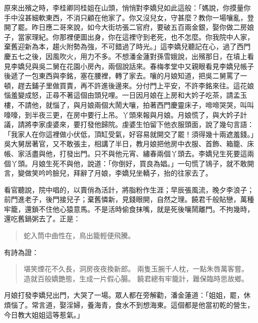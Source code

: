 原來出殯之時，李桂卿同桂姐在山頭，悄悄對李嬌兒如此這般：「媽說，你摸量你手中沒甚細軟東西，不消只顧在他家了。你又沒兒女，守甚麼？教你一場嚷亂，登開了罷。昨日應二哥來說，如今大街坊張二官府，要破五百兩金銀，娶你做二房娘子，當家理紀。你那裡便圖出身，你在這裡守到老死，也不怎麼。你我院中人家，棄舊迎新為本，趨火附勢為強，不可錯過了時光。」這李嬌兒聽記在心，過了西門慶五七之後，因風吹火，用力不多。不想潘金蓮對孫雪娥說，出殯那日，在墳上看見李嬌兒與吳二舅在花園小房內，兩個說話來。春梅孝堂中又親眼看見李嬌兒帳子後遞了一包東西與李銘，塞在腰裡，轉了家去。嚷的月娘知道，把吳二舅罵了一頓，趕去鋪子里做買賣，再不許進後邊來。分付門上平安，不許李銘來往。這花娘惱羞變成怒，正尋不著這個由頭兒哩。一日因月娘在上房和大妗子吃茶，請孟玉樓，不請他，就惱了，與月娘兩個大鬧大嚷，拍著西門慶靈床子，啼啼哭哭，叫叫嚎嚎，到半夜三更，在房中要行上吊。丫頭來報與月娘。月娘慌了，與大妗子計議，請將李家虔婆來，要打發他歸院。虔婆生怕留下他衣服頭面，說了幾句言語：「我家人在你這裡做小伏低，頂缸受氣，好容易就開交了罷！須得幾十兩遮羞錢。」吳大舅居著官，又不敢張主，相講了半日，教月娘把他房中衣服、首飾、箱籠、床帳、家活盡與他，打發出門。只不與他元宵、繡春兩個丫頭去。李嬌兒生死要這兩個丫頭。月娘生死不與他，說道：「你倒好，買良為娼。」一句慌了鴇子，就不敢開言，變做笑吟吟臉兒，拜辭了月娘，李嬌兒坐轎子，抬的往家去了。

看官聽說，院中唱的，以賣俏為活計，將脂粉作生涯；早辰張風流，晚夕李浪子；前門進老子，後門接兒子；棄舊憐新，見錢眼開，自然之理。饒君千般貼戀，萬種牢籠，還鎖不住他心猿意馬。不是活時偷食抹嘴，就是死後嚷鬧離門。不拘幾時，還吃舊鍋粥去了。正是：
\begin{quote}
蛇入筒中曲性在，鳥出籠輕便飛騰。
\end{quote}
有詩為證：
\begin{quote}
堪笑煙花不久長，洞房夜夜換新郎。
兩隻玉腕千人枕，一點朱唇萬客嘗。
造就百般嬌艷態，生成一片假心腸。
饒君總有牢籠計，難保臨時思故鄉。
\end{quote}

月娘打發李嬌兒出門，大哭了一場。眾人都在旁解勸，潘金蓮道：「姐姐，罷，休煩惱了。常言道，娶淫婦，養海青，食水不到想海東。這個都是他當初乾的營生，今日教大姐姐這等惹氣。」

